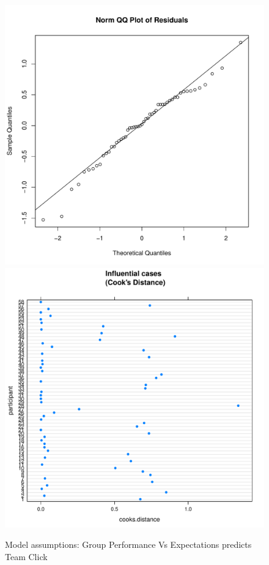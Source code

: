 \begin{CJK}{UTF8}{gbsn}
\begin{figure}[htbp]
    \includegraphics[scale =.4]{images/TEM1QQNorm.pdf}
    \includegraphics[scale =.4]{images/TEM1CooksD.pdf}
    \caption{Model assumptions: Group Performance Vs Expectations predicts Team Click}
    \label{fig:M1Assumptions}
\end{figure}




\end{CJK}
